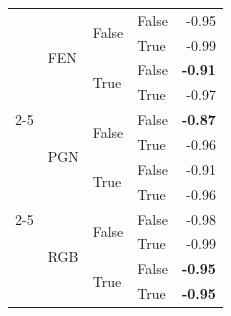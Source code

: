 \begin{tabular}{@{}llllr@{}}
                                                & \multirow[c]{4}{*}{FEN}   & \multirow[c]{2}{*}{False} & False                     & -0.95 \\
                                                &                           &                           & True                      & -0.99 \\
                                                &                           & \multirow[c]{2}{*}{True}  & False                     & \textbf{-0.91} \\
                                                &                           &                           & True                      & -0.97 \\
    \cmidrule{2-5}                                                                                                                     
                                                & \multirow[c]{4}{*}{PGN}   & \multirow[c]{2}{*}{False} & False                     & \textbf{-0.87} \\
                                                &                           &                           & True                      & -0.96 \\
                                                &                           & \multirow[c]{2}{*}{True}  & False                     & -0.91 \\
                                                &                           &                           & True                      & -0.96 \\
    \cmidrule{2-5}                                                                                                                     
                                                & \multirow[c]{4}{*}{RGB}   & \multirow[c]{2}{*}{False} & False                     & -0.98 \\
                                                &                           &                           & True                      & -0.99 \\
                                                &                           & \multirow[c]{2}{*}{True}  & False                     & \textbf{-0.95} \\
                                                &                           &                           & True                      & \textbf{-0.95} \\
   \bottomrule
\end{tabular}
